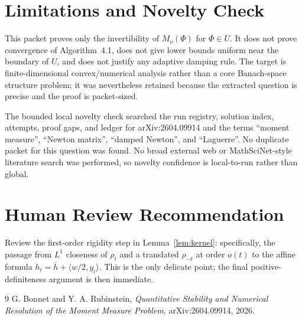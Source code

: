 \documentclass[11pt]{article}
\begin{document}
\section*{Limitations and Novelty Check}

This packet proves only the invertibility of $M_\nu(\Phi)$ for $\Phi\in U$.  It does not prove convergence of Algorithm~4.1, does not give lower bounds uniform near the boundary of $U$, and does not justify any adaptive damping rule.  The target is finite-dimensional convex/numerical analysis rather than a core Banach-space structure problem; it was nevertheless retained because the extracted question is precise and the proof is packet-sized.

The bounded local novelty check searched the run registry, solution index, attempts, proof gaps, and ledger for arXiv:2604.09914 and the terms ``moment measure'', ``Newton matrix'', ``damped Newton'', and ``Laguerre''.  No duplicate packet for this question was found.  No broad external web or MathSciNet-style literature search was performed, so novelty confidence is local-to-run rather than global.

\section*{Human Review Recommendation}

Review the first-order rigidity step in Lemma~\ref{lem:kernel}: specifically, the passage from $L^1$ closeness of $\rho_t$ and a translated $\rho_{-t}$ at order $o(t)$ to the affine formula $h_i=\bar h+\langle w/2,y_i\rangle$.  This is the only delicate point; the final positive-definiteness argument is then immediate.

\begin{thebibliography}{9}
G. Bonnet and Y. A. Rubinstein,
\emph{Quantitative Stability and Numerical Resolution of the Moment Measure Problem},
arXiv:2604.09914, 2026.
\end{thebibliography}
\end{document}
